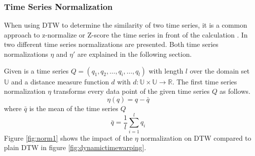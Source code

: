 \subsubsection{Time Series Normalization} \label{time_series_normalization}
When using DTW to determine the similarity of two time series, it is a common approach to z-normalize or Z-score the
time series in front of the calculation \cite{ding2008querying}. In \cite{das1998rule} two different time series
normalizations are presented. Both time series normalizations $\eta$ and $\eta '$ are explained in the following
section.

Given is a time series $Q = (q_1, q_2, \dots, q_i, \dots, q_l)$ with length $l$ over the domain set $\mathbb{U}$ and a
distance measure function $d$ with $d: \mathbb{U} \times \mathbb{U} \to \mathbb{R}$. The first time series normalization
$\eta$ transforms every data
point of the given time series $Q$ as follows.
\begin{equation}
    \eta (q) = q -\bar{q}
\end{equation}
where $\bar{q}$ is the mean of the time series $Q$
\begin{equation}
    \bar{q} = \frac{1}{l} \sum \limits_{i=1}^{l} q_i
\end{equation}
Figure \ref{fig:norm1} shows the impact of the $\eta$ normalization on DTW compared to plain DTW in figure
\ref{fig:dynamictimewarping}.

